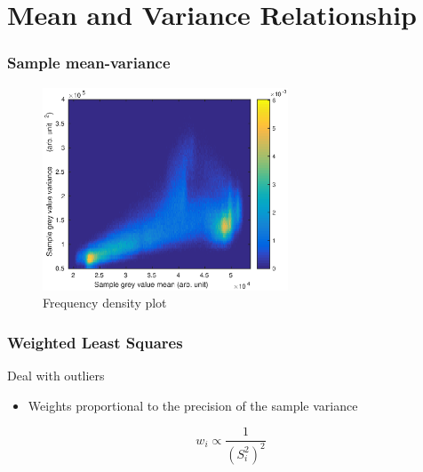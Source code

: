 \documentclass{beamer}
\begin{document}
\section{Mean and Variance Relationship}

\begin{frame}
\frametitle{Sample mean-variance}
\begin{figure}
	\includegraphics[width = 0.65\textwidth]{figures/meanVar/histogramHeatmap.eps}
	\caption{Frequency density plot}
\end{figure}
\end{frame}

\begin{frame}
\frametitle{Weighted Least Squares}
Deal with outliers
\begin{itemize}
	\item Weights proportional to the precision of the sample variance
\end{itemize}
\begin{equation}
w_i \propto \frac{1}{\left(S_i^2\right)^2}
\end{equation}
\end{frame}
\end{document}
